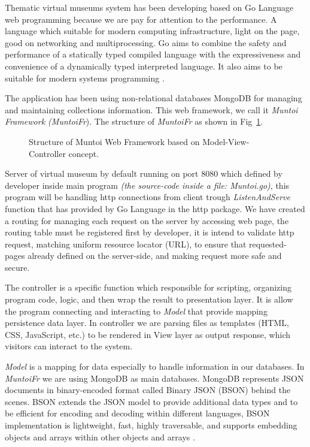 Thematic virtual museums system has been developing based on Go Language web programming because we are pay for attention to the performance. A language which suitable for modern computing infrastructure, light on the page, good on networking and multiprocessing. Go aims to combine the safety and performance of a statically typed compiled language with the expressiveness and convenience of a dynamically typed interpreted language. It also aims to be suitable for modern systems programming \cite{Pike}.

The application has been using non-relational databases MongoDB for managing and maintaining collections information. This web framework, we call it \textit{Muntoi Framework (MuntoiFr}). The structure of \textit{MuntoiFr} as shown in Fig~\cref{fig:muntoiWebFramework}.

\begin{figure}[ht]
	\caption{Structure of Muntoi Web Framework based on Model-View-Controller concept.}\label{fig:muntoiWebFramework}
\end{figure}

Server of virtual museum by default running on port 8080 which defined by developer inside main program \textit{(the source-code inside a file: Muntoi.go)}, this program will be handling http connections from client trough \textit{ListenAndServe} function that has provided by Go Language in the http package. We have created a routing for managing each request on the server by accessing web page, the routing table must be registered first by developer, it is intend to validate http request, matching uniform resource locator (URL), to ensure that requested-pages already defined on the server-side, and making request more safe and secure.

The controller is a specific function which responsible for scripting, organizing program code, logic, and then wrap the result to presentation layer. It is allow the program connecting and interacting to \textit{Model} that provide mapping persistence data layer. In controller we are parsing files as templates (HTML, CSS, JavaScript, etc.) to be rendered in View layer as output response, which visitors can interact to the system.

\textit{Model} is a mapping for data especially to handle information in our databases. In \textit{MuntoiFr} we are using MongoDB as main databases. MongoDB represents JSON documents in binary-encoded format called Binary JSON (BSON) behind the scenes. BSON extends the JSON model to provide additional data types and to be efficient for encoding and decoding within different languages, BSON implementation is lightweight, fast, highly traversable, and supports embedding objects and arrays within other objects and arrays \cite{JSONBSON}.


